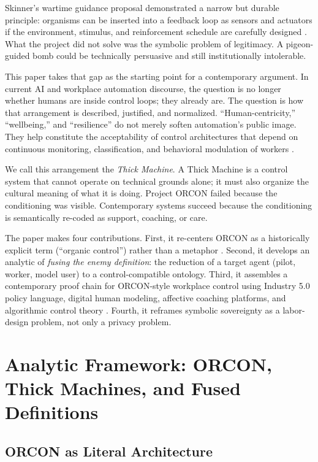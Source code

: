 \documentclass[runningheads]{llncs}
\begin{document}
Skinner's wartime guidance proposal demonstrated a narrow but durable principle: organisms can be inserted into a feedback loop as sensors and actuators if the environment, stimulus, and reinforcement schedule are carefully designed \cite{skinner1960pigeons,capshew1993engineering}. What the project did not solve was the symbolic problem of legitimacy. A pigeon-guided bomb could be technically persuasive and still institutionally intolerable.

This paper takes that gap as the starting point for a contemporary argument. In current AI and workplace automation discourse, the question is no longer whether humans are inside control loops; they already are. The question is how that arrangement is described, justified, and normalized. ``Human-centricity,'' ``wellbeing,'' and ``resilience'' do not merely soften automation's public image. They help constitute the acceptability of control architectures that depend on continuous monitoring, classification, and behavioral modulation of workers \cite{breque2021industry,kellogg2020algorithms}.

We call this arrangement the \emph{Thick Machine}. A Thick Machine is a control system that cannot operate on technical grounds alone; it must also organize the cultural meaning of what it is doing. Project ORCON failed because the conditioning was visible. Contemporary systems succeed because the conditioning is semantically re-coded as support, coaching, or care.

The paper makes four contributions. First, it re-centers ORCON as a historically explicit term (``organic control'') rather than a metaphor \cite{skinner1960pigeons}. Second, it develops an analytic of \emph{fusing the enemy definition}: the reduction of a target agent (pilot, worker, model user) to a control-compatible ontology. Third, it assembles a contemporary proof chain for ORCON-style workplace control using Industry 5.0 policy language, digital human modeling, affective coaching platforms, and algorithmic control theory \cite{breque2021industry,siemensPSXHuman,siemensHumanAdvanced,cxtoday2022cogito,kellogg2020algorithms}. Fourth, it reframes symbolic sovereignty as a labor-design problem, not only a privacy problem.

\section{Analytic Framework: ORCON, Thick Machines, and Fused Definitions}

\subsection{ORCON as Literal Architecture}
\end{document}
